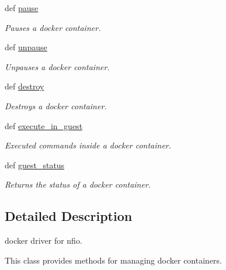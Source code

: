 \begin{DoxyCompactItemize}
def \hyperlink{classhypervisor_1_1docker__driver_1_1DockerDriver_a9ffd3b0cb02e1f292a609e1d500e683f}{pause}
\begin{DoxyCompactList}\small\item\em Pauses a docker container. \end{DoxyCompactList}\item 
def \hyperlink{classhypervisor_1_1docker__driver_1_1DockerDriver_a70f14b7780fadfd2944f1518d43a9029}{unpause}
\begin{DoxyCompactList}\small\item\em Unpauses a docker container. \end{DoxyCompactList}\item 
def \hyperlink{classhypervisor_1_1docker__driver_1_1DockerDriver_ad66fd3d60fbee2760aa6b66d996eff3c}{destroy}
\begin{DoxyCompactList}\small\item\em Destroys a docker container. \end{DoxyCompactList}\item 
def \hyperlink{classhypervisor_1_1docker__driver_1_1DockerDriver_a3df8e1aeea3e30e2fef5a5d41de08159}{execute\-\_\-in\-\_\-guest}
\begin{DoxyCompactList}\small\item\em Executed commands inside a docker container. \end{DoxyCompactList}\item 
def \hyperlink{classhypervisor_1_1docker__driver_1_1DockerDriver_aabbac18594c9b6a4ee869846996c26ae}{guest\-\_\-status}
\begin{DoxyCompactList}\small\item\em Returns the status of a docker container. \end{DoxyCompactList}\end{DoxyCompactItemize}


\subsection{Detailed Description}
docker driver for nfio. 

This class provides methods for managing docker containers. 

